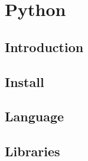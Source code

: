 

\part{Python}


\chapter{Introduction}
\label{C:python}

\FILENAME



\chapter{Install}
\label{C:python-install}





\chapter{Language}
\label{C:python-language}



\chapter{Libraries}
\label{C:python-lib}






